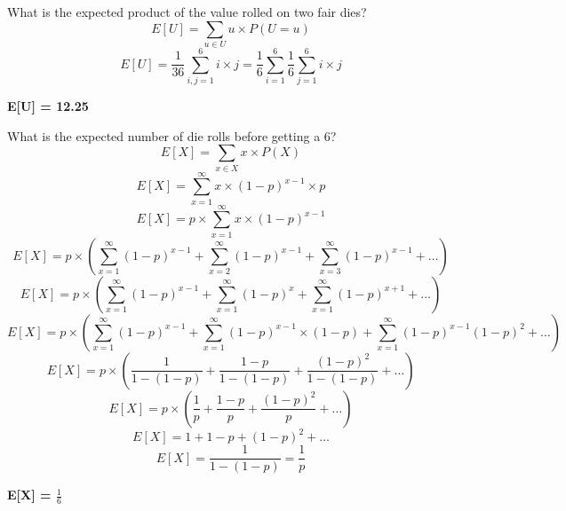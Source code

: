 \documentclass[11pt]{article}
\newenvironment{problem}[2][Problem]{\begin{trivlist}
\item[\hskip \labelsep {\bfseries #1}\hskip \labelsep {\bfseries #2.}]}{\end{trivlist}}
\begin{document}
\begin{problem}{4}
	What is the expected product of the value rolled on two fair dies?
	\begin{equation}
		E[U] = \sum_{u \in U} u \times P(U = u)
	\end{equation}
	\begin{equation}
		E[U] = \frac{1}{36}\sum_{i,j = 1}^{6} i \times j = \frac{1}{6} \sum_{i=1}^{6} \frac{1}{6} \sum_{j=1}^{6} i \times j
	\end{equation}
	\begin{center}
		\textbf{E[U] = 12.25}
	\end{center}
\end{problem}
\begin{problem}{5}
	What is the expected number of die rolls before getting a 6?
	\begin{equation}
		E[X] = \sum_{x \in X} x \times P(X)
	\end{equation}
	\begin{equation}
		E[X] = \sum_{x=1}^{\infty} x \times (1-p)^{x-1} \times p
	\end{equation}
	\begin{equation}
		E[X] = p \times \sum_{x=1}^{\infty} x \times (1-p)^{x-1}
	\end{equation}
	\begin{equation}
		E[X] = p \times \left( \sum_{x=1}^{\infty} (1-p)^{x-1} + \sum_{x=2}^{\infty} (1-p)^{x-1} + \sum_{x=3}^{\infty} (1-p)^{x-1} + \ldots \right)
	\end{equation}
	\begin{equation}
		E[X] = p \times \left( \sum_{x=1}^{\infty} (1-p)^{x-1} + \sum_{x=1}^{\infty} (1-p)^{x} + \sum_{x=1}^{\infty} (1-p)^{x+1} + \ldots \right)
	\end{equation}
	\begin{equation}
		E[X] = p \times \left( \sum_{x=1}^{\infty} (1-p)^{x-1} + \sum_{x=1}^{\infty} (1-p)^{x-1}\times(1-p) + \sum_{x=1}^{\infty} (1-p)^{x-1}(1-p)^2 + \ldots \right)
	\end{equation}
	\begin{equation}
		E[X] = p \times \left( \frac{1}{1-(1-p)} + \frac{1-p}{1-(1-p)}+ \frac{(1-p)^2}{1-(1-p)}+ \ldots \right)
	\end{equation}
	\begin{equation}
		E[X] = p \times \left( \frac{1}{p} + \frac{1-p}{p}+ \frac{(1-p)^2}{p}+ \ldots \right)
	\end{equation}
	\begin{equation}
		E[X] = 1 + 1-p + (1-p)^2 + \ldots
	\end{equation}
	\begin{equation}
		E[X] = \frac{1}{1-(1-p)} = \frac{1}{p}
	\end{equation}
	\begin{center}
		\textbf{E[X] = $\frac{1}{6}$}
	\end{center}
\end{problem}
\end{document}
